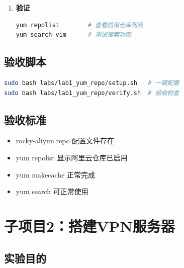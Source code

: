 \documentclass[12pt,a4paper]{ctexart}
\begin{document}
\begin{enumerate}[label=\arabic*.,leftmargin=*]
  \begin{cmdbox}
  \begin{lstlisting}[language=bash]
yum clean all
yum makecache
  \end{lstlisting}
  \end{cmdbox}

  \item \textbf{验证}

  \begin{cmdbox}
  \begin{lstlisting}[language=bash]
yum repolist        # 查看启用仓库列表
yum search vim      # 测试搜索功能
  \end{lstlisting}
  \end{cmdbox}

\end{enumerate}

\subsection{验收脚本}

\begin{cmdbox}
\small
\begin{lstlisting}[language=bash]
sudo bash labs/lab1_yum_repo/setup.sh   # 一键配置
sudo bash labs/lab1_yum_repo/verify.sh  # 验收检查
\end{lstlisting}
\end{cmdbox}

\subsection{验收标准}

\begin{itemize}
  \item rocky-aliyun.repo 配置文件存在
  \item yum repolist 显示阿里云仓库已启用
  \item yum makecache 正常完成
  \item yum search 可正常使用
\end{itemize}

\newpage
\section{子项目2：搭建VPN服务器}

\subsection{实验目的}
\end{document}

